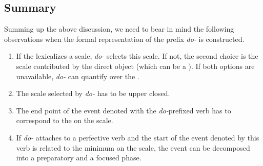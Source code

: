 \subsection{Summary}
Summing up the above discussion, we need to bear in mind the following observations when the formal representation of the prefix \textit{do-} is constructed.
\begin{enumerate}
\item If the  lexicalizes a scale, \textit{do-} selects this scale. If not, the second choice is the scale contributed by the direct object (which can be a ). If both options are unavailable, \textit{do-} can quantify over the .
\item The scale selected by \textit{do-} has to be upper closed.
\item The end point of the event denoted with the \textit{do-}prefixed verb has to correspond to the  on the scale.
\item If \textit{do-} attaches to a perfective verb and the start of the event denoted by this verb is related to the minimum on the scale, the event can be decomposed into a preparatory and a focused phase.
\end{enumerate}

